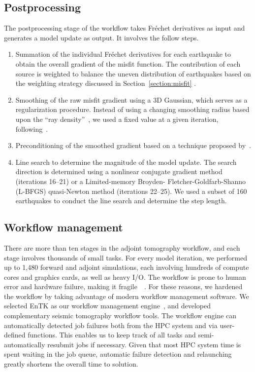 \subsection{Postprocessing}

The postprocessing stage of the workflow takes Fr\'echet derivatives as input and
generates a model update as output.
It involves the follow steps.
\begin{enumerate}
  \item Summation of the individual Fr\'echet derivatives for each earthquake to obtain the overall gradient of the misfit function. The contribution of each source is weighted to balance
    the uneven distribution of earthquakes based on the weighting strategy discussed in Section~\ref{section:misfit} .
  \item Smoothing of the raw misfit gradient using a 3D Gaussian, which
    serves as a regularization procedure. Instead of using a changing
    smoothing radius based upon the ``ray density''~\cite{bozdaug2016global},
    we used a fixed value at a given iteration, following~\cite{zhu2012structure}.
  \item Preconditioning of the smoothed gradient based on a technique proposed by~\cite{luo2013strategies}.
  \item Line search to determine the magnitude of the model update.
  The search direction is determined using a nonlinear conjugate gradient method~\cite{wright1999numerical} (iterations 16--21) or a Limited-memory Broyden- Fletcher-Goldfarb-Shanno (L-BFGS) quasi-Newton method (iterations 22--25).
  We used a subset of 160 earthquakes to conduct the line search and determine the step length.
\end{enumerate}

\subsection{Workflow management}

There are more than ten stages in the adjoint tomography workflow,
and each stage involves thousands of small tasks.
For every model iteration,
we performed up to 1,480 forward and adjoint simulations, each involving hundreds of
compute cores and graphics cards, as well as heavy I/O.
The workflow is prone to human error and hardware failure, making it fragile~~\cite{Lefebvre2018}.
For these reasons, we hardened the workflow by taking advantage of modern
workflow management software.
We selected EnTK as our
workflow management engine~\cite{EnTK2017}, and developed complementary seismic tomography
workflow tools.
The workflow engine can automatically detected job failures both from the
HPC system and via user-defined functions. This enables us to keep track of
all tasks and semi-automatically resubmit jobs if necessary.
Given that most HPC system time is spent waiting in the job queue, automatic
failure detection and relaunching greatly shortens the overall time to solution.

